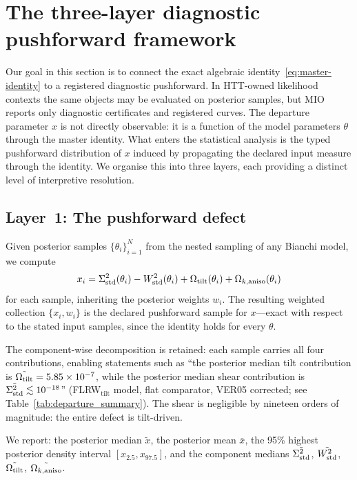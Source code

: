 \section{The three-layer diagnostic pushforward framework}
\label{sec:three-layer}

Our goal in this section is to connect the exact algebraic
identity~\eqref{eq:master-identity} to a registered diagnostic
pushforward.  In HTT-owned likelihood contexts the same objects
may be evaluated on posterior samples, but MIO reports only
diagnostic certificates and registered curves.  The departure
parameter $x$ is not directly observable: it is a function of
the model parameters $\theta$ through the master identity.  What
enters the statistical analysis is the typed pushforward
distribution of $x$ induced by propagating the declared input
measure through the identity.
We organise this into three layers, each providing a distinct
level of interpretive resolution.


\subsection{Layer~1: The pushforward defect}
\label{sec:layer1}

Given posterior samples $\{\theta_i\}_{i=1}^N$ from the nested
sampling of any Bianchi model, we compute
\begin{equation}\label{eq:xi-pushforward}
x_i = \Sigma^2_{\mathrm{std}}(\theta_i) - W^2_{\mathrm{std}}(\theta_i)
      + \Omega_{\mathrm{tilt}}(\theta_i) + \Omega_{k,\mathrm{aniso}}(\theta_i)
\end{equation}
for each sample, inheriting the posterior weights $w_i$.  The
resulting weighted collection $\{x_i, w_i\}$ is the declared
pushforward sample for $x$---exact with respect to the stated
input samples, since the identity holds for every $\theta$.

The component-wise decomposition is retained: each sample
carries all four contributions, enabling statements such as
``the posterior median tilt contribution is
$\tilde{\Omega_{\mathrm{tilt}}} = 5.85 \times 10^{-7}$, while the posterior
median shear contribution is
$\tilde{\Sigma^2_{\mathrm{std}}} \lesssim 10^{-18}$''
(FLRW$_{\mathrm{tilt}}$ model, flat comparator, VER05 corrected; see
Table~\ref{tab:departure_summary}).  The shear is negligible by
nineteen orders of magnitude: the entire defect is tilt-driven.

\begin{definition}
\label{def:x-summaries}
We report:
the posterior median $\tilde{x}$,
the posterior mean $\bar{x}$,
the 95\% highest posterior density interval
$[x_{2.5}, x_{97.5}]$,
and the component medians
$\tilde{\Sigma^2_{\mathrm{std}}}$, $\tilde{W^2_{\mathrm{std}}}$,
$\tilde{\Omega_{\mathrm{tilt}}}$, $\tilde{\Omega_{k,\mathrm{aniso}}}$.
\end{definition}


